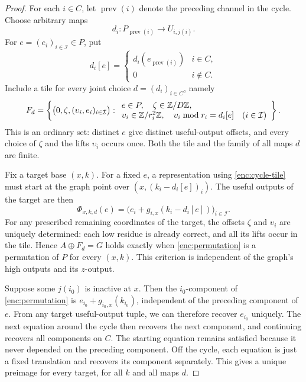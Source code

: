 \begin{proof}
For each $i\in C$, let $\operatorname{prev}(i)$ denote the preceding
channel in the cycle.  Choose arbitrary maps
\[
 d_i:P_{\operatorname{prev}(i)}\longrightarrow U_{i,j(i)}.
\]
For $e=(e_i)_{i\in\mathcal I}\in P$, put
\[
 d_i[e]=
 \begin{cases}
  d_i(e_{\operatorname{prev}(i)})&i\in C,\\
  0&i\notin C.
 \end{cases}
\]
Include a tile for every joint choice $d=(d_i)_{i\in C}$, namely
\begin{equation}
 F_d=\left\{
 \bigl(0,\zeta,(\upsilon_i,e_i)_{i\in\mathcal I}\bigr):
 \begin{array}{l}
 e\in P,\quad \zeta\in\mathbb Z/D\mathbb Z,\\
 \upsilon_i\in\mathbb Z/r_i^2\mathbb Z,\quad
 \upsilon_i\bmod r_i=d_i[e]\quad(i\in\mathcal I)
 \end{array}
 \right\}.
 \label{enc:cycle-tile}
\end{equation}
This is an ordinary set: distinct $e$ give distinct useful-output
offsets, and every choice of $\zeta$ and the lifts $\upsilon_i$
occurs once.  Both the tile and the family of all maps $d$ are finite.

Fix a target base $(x,k)$.  For a fixed $e$, a representation using
\eqref{enc:cycle-tile} must start at the graph point over
$(x,(k_i-d_i[e])_i)$.  The useful outputs of the target are then
\begin{equation}
 \Phi_{x,k,d}(e)
   =\bigl(e_i+g_{i,x}(k_i-d_i[e])\bigr)_{i\in\mathcal I}.
 \label{enc:permutation}
\end{equation}
For any prescribed remaining coordinates of the target, the offsets
$\zeta$ and $\upsilon_i$ are uniquely determined: each low residue is
already correct, and all its lifts occur in the tile.
Hence $A\oplus F_d=G$ holds exactly when \eqref{enc:permutation} is a
permutation of $P$ for every $(x,k)$.  This criterion is independent
of the graph's high outputs and its $z$-output.

Suppose some $j(i_0)$ is inactive at $x$.  Then the $i_0$-component
of \eqref{enc:permutation} is $e_{i_0}+g_{i_0,x}(k_{i_0})$,
independent of the preceding component of $e$.
From any target useful-output tuple, we can therefore recover
$e_{i_0}$ uniquely.  The next equation around the cycle then recovers
the next component, and continuing recovers all components on $C$.
The starting equation remains satisfied because it never depended
on the preceding component.  Off the cycle, each equation is just a
fixed translation and recovers its component separately.  This gives
a unique preimage for every target, for all $k$ and all maps $d$.


\end{proof}
